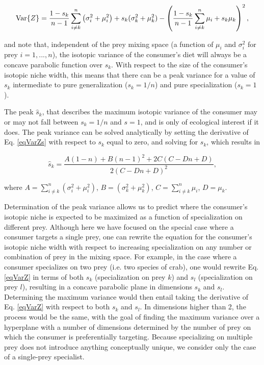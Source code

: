 \documentclass{frontiersSCNS}
\begin{document}
\begin{equation}
\label{eqVarZs}
{\rm Var}\{Z\} = \frac{1-s_k}{n-1}\sum_{i \neq k}^n \left(\sigma_i^2 + \mu_i^2\right) + s_k(\sigma_k^2 + \mu_k^2) - \left(\frac{1-s_k}{n-1}\sum_{i \neq k}^n \mu_i + s_k\mu_k \right)^2,
\end{equation}

\noindent and note that, independent of the prey mixing space (a function of $\mu_i$ and $\sigma_i^2$ for prey $i=1,...,n$), the isotopic variance of the consumer's diet will always be a concave parabolic function over $s_k$.
With respect to the size of the consumer's isotopic niche width, this means that there can be a peak variance for a value of $s_k$ intermediate to pure generalization ($s_k=1/n$) and pure specialization ($s_k=1$).

The peak $\hat s_k$, that describes the maximum isotopic variance of the consumer may or may not fall between $s_k=1/n$ and $s=1$, and is only of ecological interest if it does.
The peak variance can be solved analytically by setting the derivative of Eq. \ref{eqVarZs} with respect to $s_k$ equal to zero, and solving for $s_k$, which results in

\begin{equation}
	\hat s_k = \frac{A(1-n)+B (n-1)^2+2 C (C-D n+D)}{2 (C-D n+D)^2},
\end{equation}

\noindent where $A = \sum_{i \neq k}^n \left(\sigma_i^2 + \mu_i^2\right)$, $B = \left(\sigma_k^2 + \mu_k^2\right)$, $C = \sum_{i \neq k}^n \mu_i$, $D = \mu_k$.

Determination of the peak variance allows us to predict where the consumer's isotopic niche is expected to be maximized as a function of specialization on different prey.
Although here we have focused on the special case where a consumer targets a single prey, one can rewrite the equation for the consumer's isotopic niche width with respect to increasing specialization on any number or combination of prey in the mixing space.
For example, in the case where a consumer specializes on two prey (i.e. two species of crab), one would rewrite Eq. \ref{eqVarZ} in terms of both $s_k$ (specialization on prey $k$) and $s_l$ (specialization on prey $l$), resulting in a concave parabolic plane in dimensions $s_k$ and $s_l$.
Determining the maximum variance would then entail taking the derivative of Eq. \ref{eqVarZ} with respect to both $s_k$ and $s_l$.
In dimensions higher than 2, the process would be the same, with the goal of finding the maximum variance over a hyperplane with a number of dimensions determined by the number of prey on which the consumer is preferentially targeting.
Because specializing on multiple prey does not introduce anything conceptually unique, we consider only the case of a single-prey specialist.
\end{document}

